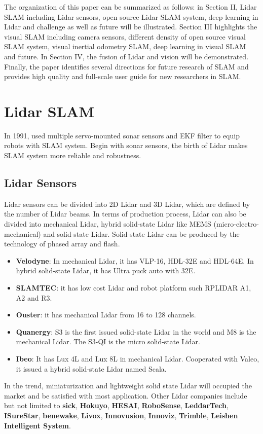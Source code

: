 \documentclass[journal,transmag]{IEEEtran}
\begin{document}
The organization of this paper can be summarized as follows: in Section II, Lidar SLAM including Lidar sensors, open source Lidar SLAM system, deep learning in Lidar and challenge as well as future will be illustrated. Section III highlights the visual SLAM including camera sensors, different density of open source visual SLAM system, visual inertial odometry SLAM, deep learning in visual SLAM and future. In Section IV, the fusion of Lidar and vision will be demonstrated. Finally, the paper identifies several directions for future research of SLAM and provides high quality and full-scale user guide for new researchers in SLAM.
\section{Lidar SLAM}
In 1991, \cite{leonard1991simultaneous} used multiple servo-mounted sonar sensors and EKF filter to equip robots with SLAM system. Begin with sonar sensors, the birth of Lidar makes SLAM system more reliable and robustness.
\subsection{Lidar Sensors}
Lidar sensors can be divided into 2D Lidar and 3D Lidar, which are defined by the number of Lidar beams. In terms of production process, Lidar can also be divided into mechanical Lidar, hybrid solid-state Lidar like MEMS (micro-electro-mechanical) and solid-state Lidar. Solid-state Lidar can be produced by the technology of phased array and flash.
\begin{itemize}
    \item \textbf{Velodyne}: In mechanical Lidar, it has VLP-16, HDL-32E and HDL-64E. In hybrid solid-state Lidar, it has Ultra puck auto with 32E.  
    \item \textbf{SLAMTEC}: it has low cost Lidar and robot platform such RPLIDAR A1, A2 and R3. 
    \item \textbf{Ouster}: it has mechanical Lidar from 16 to 128 channels.
    \item \textbf{Quanergy}: S3 is the first issued solid-state Lidar in the world and M8 is the mechanical Lidar. The S3-QI is the micro solid-state Lidar.
    \item \textbf{Ibeo}: It has Lux 4L and Lux 8L in mechanical Lidar. Cooperated with Valeo, it issued a hybrid solid-state Lidar named Scala.
\end{itemize}

In the trend, miniaturization and lightweight solid state Lidar will occupied the market and be satisfied with most application. Other Lidar companies include but not limited to \textbf{sick}, \textbf{Hokuyo}, \textbf{HESAI}, \textbf{RoboSense}, \textbf{LeddarTech}, \textbf{ISureStar}, \textbf{benewake}, \textbf{Livox}, \textbf{Innovusion}, \textbf{Innoviz}, \textbf{Trimble}, \textbf{Leishen Intelligent System}.
\end{document}
